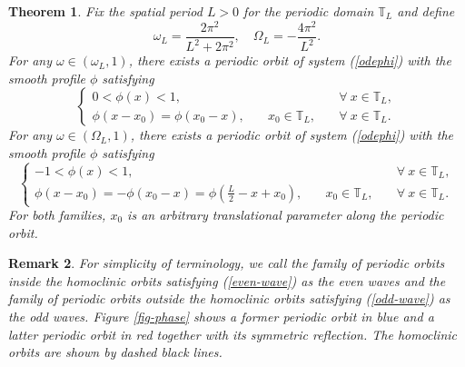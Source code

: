 \documentclass[12pt,reqno]{amsart}
\numberwithin{equation}{section}
\numberwithin{figure}{section}
\newtheorem{theorem}{Theorem}[section]
\newtheorem{remark}[theorem]{Remark}
\begin{document}
\begin{theorem}
	\label{th-existence}
	Fix the spatial period $L > 0$ for the periodic domain $\mathbb{T}_L$ and define 
	$$
	\omega_L = \frac{2 \pi^2}{L^2 + 2 \pi^2}, \quad \Omega_L = -\frac{4 \pi^2}{L^2}.
	$$
	For any $\omega \in (\omega_L,1)$, 
	there exists a periodic orbit of system (\ref{odephi}) with the smooth profile $\phi$ satisfying
	\begin{equation}
	\label{even-wave}
	\left\{ \begin{array}{lll} 0 < \phi(x) < 1, \quad & & \forall\ x \in \mathbb{T}_L,\\ \phi(x-x_0) = \phi(x_0-x), \quad & x_0 \in \mathbb{T}_L, \quad & \forall\ x \in \mathbb{T}_L.
	\end{array} \right.
	\end{equation}
	For any $\omega \in (\Omega_L,1)$, 
	there exists a periodic orbit of system (\ref{odephi}) with the smooth profile $\phi$ satisfying 
	\begin{equation}
	\label{odd-wave}
		\left\{ \begin{array}{lll} 
	-1 < \phi(x) < 1, \quad & & \forall\ x \in \mathbb{T}_L, \\
\phi(x-x_0) = -\phi(x_0-x) = \phi\left(\frac{L}{2} - x+x_0 \right), \quad & 
x_0 \in \mathbb{T}_L, \quad & \forall\ x \in \mathbb{T}_L.
	 	\end{array} \right.
	\end{equation}
	For both families, $x_0$ is an arbitrary translational parameter along the periodic orbit. 
\end{theorem} 

\begin{remark}
For simplicity of terminology, we call the family of periodic orbits inside the homoclinic orbits satisfying (\ref{even-wave}) as the even waves and the family of periodic orbits outside the homoclinic orbits satisfying (\ref{odd-wave}) as the odd waves. Figure \ref{fig-phase} shows a former periodic orbit in blue and a latter periodic orbit in red together with its symmetric reflection. The homoclinic orbits are shown by dashed black lines.
\end{remark}
	
\end{document}
